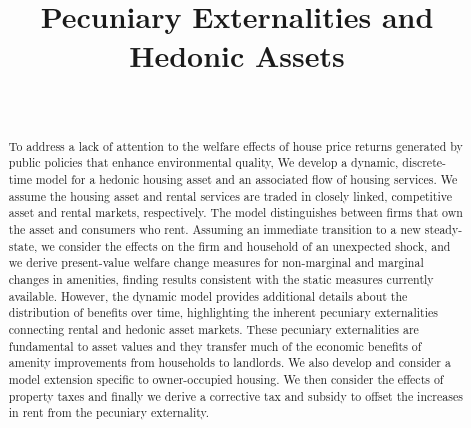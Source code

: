 \documentclass[ecta,nameyear,draft]{econsocart}
\theoremstyle{plain}
\theoremstyle{remark}
\begin{document}
\begin{frontmatter}

\title{Pecuniary Externalities and Hedonic Assets}

\begin{aug}
%
%
%
\author[id=au1,addressref={add1}]{~}
\address[id=add1]{%
,
}


\end{aug}

%
\begin{abstract}
To address a lack of attention to the welfare effects of house price returns generated by public policies that enhance environmental quality, We develop a dynamic, discrete-time model for a hedonic housing asset and an associated flow of housing services. We assume the housing asset and rental services are traded in closely linked, competitive asset and rental markets, respectively. The model distinguishes between firms that own the asset and consumers who rent. Assuming an immediate transition to a new steady-state, we consider the effects on the firm and household of an unexpected shock, and we derive present-value welfare change measures for non-marginal and marginal changes in amenities, finding results consistent with the static measures currently available. However, the dynamic model provides additional details about the distribution of benefits over time, highlighting the inherent pecuniary externalities connecting rental and hedonic asset markets. These pecuniary externalities are fundamental to asset values and they transfer much of the economic benefits of amenity improvements from households to landlords. We also develop and consider a model extension specific to owner-occupied housing. We then consider the effects of property taxes and finally we derive a corrective tax and subsidy to offset the increases in rent from the pecuniary externality. 
\end{abstract}

\begin{keyword}
\end{keyword}

\end{frontmatter}
\end{document}

